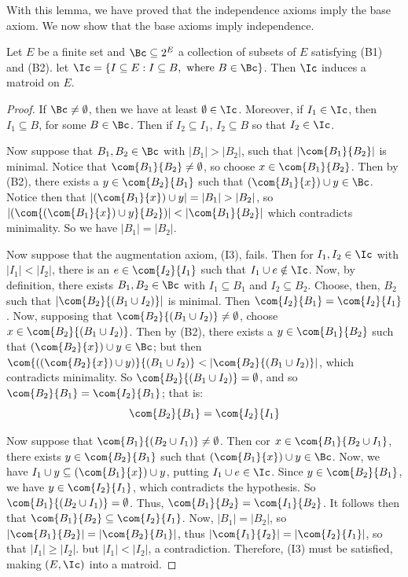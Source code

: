 With this lemma, we have proved that the independence axioms imply the base
axiom. We now show that the base axioms imply independence.

\begin{theorem}\label{1.2.3}
    Let $E$ be a finite set and  $\Bc \subseteq 2^E$ a collection of subsets of
    $E$ satisfying (B1) and (B2). let $\Ic=\{I \subseteq E : I \subseteq B,
    \text{ where } B \in \Bc\}$. Then $\Ic$ induces a matroid on  $E$.
\end{theorem}
\begin{proof}
    If  $\Bc \neq \emptyset$, then we have at least  $\emptyset \in \Ic$.
    Moreover, if $I_1 \in \Ic$, then $I_1 \subseteq B$, for some $B \in \Bc$.
    Then if  $I_2 \subseteq I_1$, $I_2 \subseteq B$ so that $I_2 \in \Ic$.

    Now suppose that $B_1,B_2 \in \Bc$ with $|B_1|>|B_2|$, such that
    $|\com{B_1}{B_2}|$ is minimal. Notice that $\com{B_1}{B_2} \neq \emptyset$,
    so choose $x \in \com{B_1}{B_2}$. Then by (B2), there exists a $y \in
    \com{B_2}{B_1}$ such that $(\com{B_1}{x}) \cup y \in \Bc$. Notice then that
    $|(\com{B_1}{x}) \cup y|=|B_1|>|B_2|$, so $|(\com{(\com{B_1}{x}) \cup
    y}{B_2})|<|\com{B_1}{B_2}|$ which contradicts minimality. So we have
    $|B_1|=|B_2|$.

    Now suppose that the augmentation axiom, (I3), fails. Then for $I_1,I_2 \in
    \Ic$ with $|I_1|<|I_2|$, there is an $e \in \com{I_2}{I_1}$ such that $I_1
    \cup e \notin \Ic$. Now, by definition, there exists $B_1,B_2 \in \Bc$ with
    $I_1 \subseteq B_1$ and $I_2 \subseteq B_2$. Choose, then, $B_2$ such that
    $|\com{B_2}{(B_1 \cup I_2)}|$ is minimal. Then
    $\com{I_2}{B_1}=\com{I_2}{I_1}$. Now, supposing that $\com{B_2}{(B_1 \cup
    I_2)} \neq \emptyset$, choose $x \in \com{B_2}{(B_1 \cup I_2)}$. Then by
    (B2), there exists a $y \in \com{B_1}{B_2}$ such that $(\com{B_2}{x}) \cup y
    \in \Bc$; but then $\com{((\com{B_2}{x}) \cup y)}{(B_1 \cup
    I_2)}<|\com{B_2}{(B_1 \cup I_2)}|$, which contradicts minimality. So
    $\com{B_2}{(B_1 \cup I_2)}=\emptyset$, and so
    $\com{B_2}{B_1}=\com{I_2}{B_1}$; that is:
    \begin{equation*}
        \com{B_2}{B_1}=\com{I_2}{I_1}
    \end{equation*}

    Now suppose that $\com{B_1}{(B_2 \cup I_1)} \neq \emptyset$. Then cor $x \in
    \com{B_1}{B_2 \cup I_1}$, there exists $y \in \com{B_2}{B_1}$ such that
    $(\com{B_1}{x}) \cup y \in \Bc$. Now, we have $I_1 \cup y \subseteq
    (\com{B_1}{x}) \cup y$, putting $I_1 \cup e \in \Ic$. Since $y \in
    \com{B_2}{B_1}$, we have $y \in \com{I_2}{I_1}$, which contradicts the
    hypothesis. So $\com{B_1}{(B_2 \cup I_1)}=\emptyset$. Thus,
    $\com{B_1}{B_2}=\com{I_1}{B_2}$. It follows then that $\com{B_1}{B_2}
    \subseteq \com{I_2}{I_1}$. Now, $|B_1|=|B_2|$, so
    $|\com{B_1}{B_2}|=|\com{B_2}{B_1}|$, thus
    $|\com{I_1}{I_2}|=|\com{I_2}{I_1}|$, so that $|I_1| \geq |I_2|$. but
    $|I_1|<|I_2|$, a contradiction. Therefore, (I3) must be satisfied, making
    $(E,\Ic)$ into a matroid.
\end{proof}
